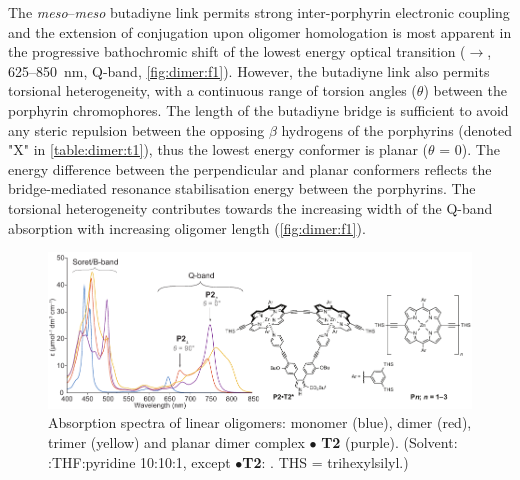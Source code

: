 	The \textit{meso}--\textit{meso} butadiyne link permits strong inter-porphyrin electronic coupling and the extension of conjugation upon oligomer homologation is most apparent in the progressive bathochromic shift of the lowest energy optical transition ($\rightarrow{}$, 625–\SI{850}{\nano\metre}, Q-band, \autoref{fig:dimer:f1}). However, the butadiyne link also permits torsional heterogeneity, with a continuous range of torsion angles ($\theta$) between the porphyrin chromophores. The length of the butadiyne bridge is sufficient to avoid any steric repulsion between the opposing $\beta$ hydrogens of the porphyrins (denoted "X" in \autoref{table:dimer:t1}), thus the lowest energy conformer is planar ($\theta$ = 0\textdegree{}). The energy difference between the perpendicular and planar conformers reflects the bridge-mediated resonance stabilisation energy between the porphyrins. The torsional heterogeneity contributes towards the increasing width of the Q-band absorption with increasing oligomer length (\autoref{fig:dimer:f1}).

	\begin{figure}[ht!]
		\centering\includegraphics{figures/dimer/Figure-1.pdf} 
		\caption[]{Absorption spectra of linear oligomers: monomer  (blue), dimer  (red), trimer  (yellow) and planar dimer complex  $\bullet$ \textbf{T2} (purple). (Solvent: :THF:pyridine 10:10:1, except $\bullet$\textbf{T2}: \dcm. THS = trihexylsilyl.)}
		\label{fig:dimer:f1}
	\end{figure}

